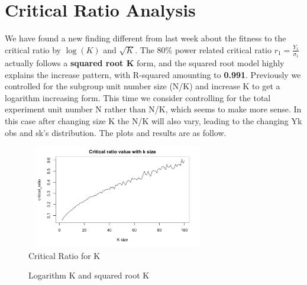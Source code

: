 \documentclass[10pt,english]{article}\usepackage{graphicx, color}
\numberwithin{equation}{section}
\numberwithin{figure}{section}
\begin{document}
\section{Critical Ratio Analysis}
We have found a new finding different from last week about the fitness to the critical ratio by $\log(K)$ and $\sqrt{K}$. The 80\% power related critical ratio $r_1=\frac{Y_1}{\sigma_1}$ actually follows a \textbf{squared root K} form, and the squared root model highly explains the increase pattern, with R-squared amounting to \textbf{0.991}. Previously we controlled for the subgroup unit number size (N/K) and increase K to get a logarithm increasing form. This time we consider controlling for the total experiment unit number N rather than N/K, which seems to make more sense. In this case after changing size K the N/K will also vary, leading to the changing Yk obs and sk's distribution. The plots and results are as follow.
\begin{figure}[htbp]
\centering\includegraphics[width=8cm,height=4.5cm]{k}
\caption{Critical Ratio for K}
\end{figure}
\begin{figure}[htbp]
\centering{}
\caption{Logarithm K and squared root K}
\end{figure}
\end{document}
